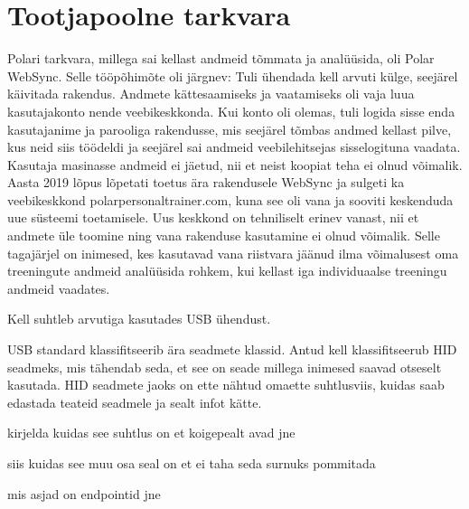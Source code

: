 \section{Tootjapoolne tarkvara}\label{sec:tootja-soft}
Polari tarkvara, millega sai kellast andmeid tõmmata ja analüüsida, oli Polar WebSync.
Selle tööpõhimõte oli järgnev:
Tuli ühendada kell arvuti külge, seejärel käivitada rakendus.
Andmete kättesaamiseks ja vaatamiseks oli vaja luua kasutajakonto nende veebikeskkonda.
Kui konto oli olemas, tuli logida sisse enda kasutajanime ja parooliga rakendusse, mis seejärel tõmbas andmed kellast pilve, kus neid siis töödeldi ja seejärel sai andmeid veebilehitsejas sisselogituna vaadata. 
Kasutaja masinasse andmeid ei jäetud, nii et neist koopiat teha ei olnud võimalik.
Aasta 2019 lõpus\cite{polar-ws-discontinued} lõpetati toetus ära rakendusele WebSync ja sulgeti ka veebikeskkond polarpersonaltrainer.com, kuna see oli vana ja sooviti keskenduda uue süsteemi toetamisele.
Uus keskkond on tehniliselt erinev vanast, nii et andmete üle toomine ning vana rakenduse kasutamine ei olnud võimalik.
Selle tagajärjel on inimesed, kes kasutavad vana riistvara jäänud ilma võimalusest oma treeningute andmeid analüüsida rohkem, kui kellast iga individuaalse treeningu andmeid vaadates.

Kell suhtleb arvutiga kasutades USB ühendust.

USB standard klassifitseerib ära seadmete klassid. Antud kell klassifitseerub HID seadmeks, mis tähendab seda, et see on seade millega inimesed saavad otseselt kasutada.
HID seadmete jaoks on ette nähtud omaette suhtlusviis, kuidas saab edastada teateid seadmele ja sealt infot kätte.

kirjelda kuidas see suhtlus on et koigepealt avad jne 

siis kuidas see muu osa seal on et ei taha seda surnuks pommitada

mis asjad on endpointid jne

